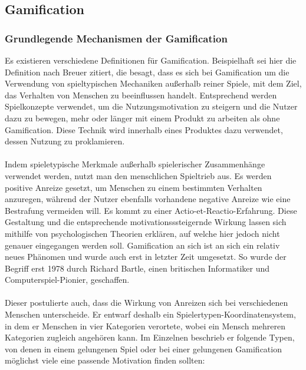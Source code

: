 \subsection{Gamification}
\subsubsection{Grundlegende Mechanismen der Gamification}
Es existieren verschiedene Definitionen für Gamification. Beispielhaft sei hier die Definition nach Breuer zitiert, die besagt, dass es sich bei Gamification um die \glqq Verwendung von spieltypischen Mechaniken außerhalb reiner Spiele, mit dem Ziel, das Verhalten von Menschen zu beeinflussen\grqq \cite{Src:GamifKochOtt} handelt. Entsprechend werden Spielkonzepte verwendet, um die Nutzungsmotivation zu steigern und die Nutzer dazu zu bewegen, mehr oder länger mit einem Produkt zu arbeiten als ohne Gamification. Diese Technik wird innerhalb eines Produktes dazu verwendet, dessen Nutzung zu proklamieren. \cite{Src:GamifKochOtt} \\ \\
Indem spieletypische Merkmale außerhalb spielerischer Zusammenhänge verwendet werden, nutzt man den menschlichen Spieltrieb aus. Es werden positive Anreize gesetzt, um Menschen zu einem bestimmten Verhalten anzuregen, während der Nutzer ebenfalls vorhandene negative Anreize wie eine Bestrafung vermeiden will. \cite{Src:PlanetWissen} Es kommt zu einer \glqq Actio-et-Reactio\grqq -Erfahrung.\cite{Src:GamifKochOtt} Diese Gestaltung und die entsprechende motivationsssteigernde Wirkung lassen sich mithilfe von psychologischen Theorien erklären, auf welche hier jedoch nicht genauer eingegangen werden soll. Gamification an sich ist an sich ein relativ neues Phänomen und wurde auch erst in letzter Zeit umgesetzt. So wurde der Begriff erst 1978 durch Richard Bartle, einen britischen Informatiker und Computerspiel-Pionier, geschaffen. \cite{Src:PlanetWissen} \\ \\
Dieser postulierte auch, dass die Wirkung von Anreizen sich bei verschiedenen Menschen unterscheide. Er entwarf deshalb ein Spielertypen-Koordinatensystem, in dem er Menschen in vier Kategorien verortete, wobei ein Mensch mehreren Kategorien zugleich angehören kann.\cite{Src:Bartle} Im Einzelnen beschrieb er folgende Typen, von denen in einem gelungenen Spiel oder bei einer gelungenen Gamification möglichst viele eine passende Motivation finden sollten:

